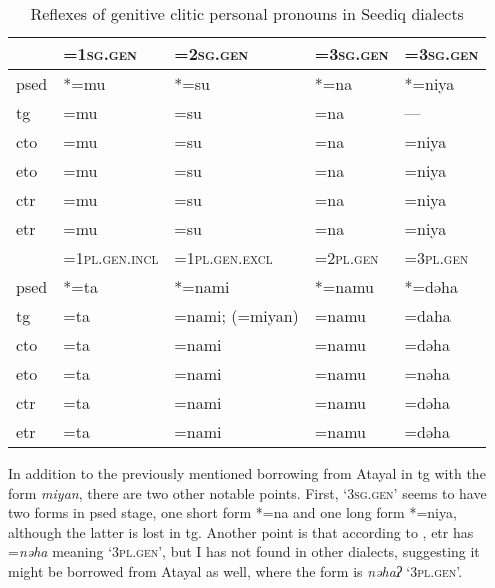 \begin{table}[!htbp]
\centering
\caption{Reflexes of genitive clitic personal pronouns in Seediq dialects}
\label{tab:genclitic}
\begin{tabular}{lllll}
\hline
      & =\textsc{1sg.gen}      & =\textsc{2sg.gen}        & =\textsc{3sg.gen} & =\textsc{3sg.gen}       \\ \hline
\acs{psed} & *=mu          & *=su            & *=na     & *=niya         \\
\acs{tg}  & =mu           & =su             & =na      & ---            \\
\acs{cto}  & =mu           & =su             & =na      & =niya          \\
\acs{eto}  & =mu           & =su             & =na      & =niya          \\
\acs{ctr} & =mu           & =su             & =na      & =niya          \\
\acs{etr} & =mu           & =su             & =na      & =niya          \\ \hline
      & =\textsc{1pl.gen.incl} & =\textsc{1pl.gen.excl}   & =\textsc{2pl.gen} & =\textsc{3pl.gen}       \\ \hline
\acs{psed} & *=ta          & *=nami          & *=namu   & *=dəha         \\
\acs{tg}  & =ta           & =nami; (=miyan) & =namu    & =daha          \\
\acs{cto}  & =ta           & =nami           & =namu    & =dəha          \\
\acs{eto}  & =ta           & =nami           & =namu    & =nəha          \\
\acs{ctr} & =ta           & =nami           & =namu    & =dəha          \\
\acs{etr} & =ta           & =nami           & =namu    & =dəha     \\ \hline
\end{tabular}
\end{table}

In addition to the previously mentioned borrowing from Atayal in \acl{tg} with the form \textit{miyan}, there are two other notable points. First, `\textsc{3sg.gen}' seems to have two forms in \acl{psed} stage, one short form *=na and one long form *=niya, although the latter is lost in \acl{tg}. Another point is that according to \textcite{lee2015tawsa}, \acl{etr} has =\textit{nəha} meaning `\textsc{3pl.gen}', but I has not found in other dialects, suggesting it might be borrowed from Atayal as well, where the form is \textit{nəhaʔ} `\textsc{3pl.gen}'.

